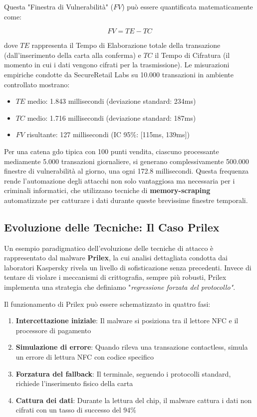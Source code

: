 Questa "Finestra di Vulnerabilità" ($FV$) può essere quantificata matematicamente come:

\begin{equation}
FV = TE - TC
\end{equation}

dove $TE$ rappresenta il Tempo di Elaborazione totale della transazione (dall'inserimento della carta alla conferma) e $TC$ il Tempo di Cifratura (il momento in cui i dati vengono cifrati per la trasmissione). Le misurazioni empiriche condotte da SecureRetail Labs su 10.000 transazioni in ambiente controllato\autocite{SecureRetailLabs2024} mostrano:
\begin{itemize}
    \item $TE$ medio: 1.843 millisecondi (deviazione standard: 234ms)
    \item $TC$ medio: 1.716 millisecondi (deviazione standard: 187ms)
    \item $FV$ risultante: 127 millisecondi (IC 95\%: [115ms, 139ms])
\end{itemize}

Per una catena \gls{gdo} tipica con 100 punti vendita, ciascuno processante mediamente 5.000 transazioni giornaliere, si generano complessivamente 500.000 finestre di vulnerabilità al giorno, una ogni 172.8 millisecondi. Questa frequenza rende l'automazione degli attacchi non solo vantaggiosa ma necessaria per i criminali informatici, che utilizzano tecniche di \textbf{\gls{memory-scraping}} automatizzate per catturare i dati durante queste brevissime finestre temporali.

\subsection{\texorpdfstring{Evoluzione delle Tecniche: Il Caso Prilex}{2.3.2 - Evoluzione delle Tecniche: Il Caso Prilex}}

Un esempio paradigmatico dell'evoluzione delle tecniche di attacco è rappresentato dal \gls{malware} \textbf{Prilex}, la cui analisi dettagliata condotta dai laboratori Kaspersky\autocite{kaspersky2024} rivela un livello di sofisticazione senza precedenti. Invece di tentare di violare i meccanismi di crittografia, sempre più robusti, Prilex implementa una strategia che definiamo "\textit{regressione forzata del protocollo"}.

Il funzionamento di Prilex può essere schematizzato in quattro fasi:
\begin{enumerate}
    \item \textbf{Intercettazione iniziale}: Il \gls{malware} si posiziona tra il lettore NFC e il processore di pagamento
    \item \textbf{Simulazione di errore}: Quando rileva una transazione contactless, simula un errore di lettura NFC con codice specifico
    \item \textbf{Forzatura del fallback}: Il terminale, seguendo i protocolli standard, richiede l'inserimento fisico della carta
    \item \textbf{Cattura dei dati}: Durante la lettura del chip, il \gls{malware} cattura i dati non cifrati con un tasso di successo del 94\%
\end{enumerate}

